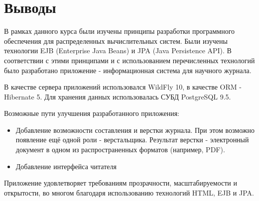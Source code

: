 \section{Выводы}
В рамках данного курса были изучены принципы разработки программного обеспечения для распределенных вычислительных систем. Были изучены технологии EJB (Enterprise Java Beans) и JPA (Java Persistence API). В соответствии с этими принципами и с использованием перечисленных технологий было разработано приложение - информационная система для научного журнала.

В качестве сервера приложений использовался WildFly 10, в качестве ORM - Hibernate 5. Для хранения данных использовалась СУБД PostgreSQL 9.5.

Возможные пути улучшения разработанного приложения:

\begin{itemize}
\item Добавление возможности составления и верстки журнала. При этом возможно появление ещё одной роли - верстальщика. Результат верстки - электронный документ в одном из распространенных форматов (например, PDF).
\item Добавление интерфейса читателя
\end{itemize}

Приложение удовлетворяет требованиям прозрачности, масштабируемости и открытости, во многом благодаря использованию технологий HTML, EJB и JPA.